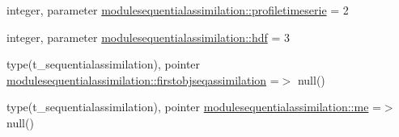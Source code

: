 \begin{DoxyCompactItemize}
\item 
integer, parameter \mbox{\hyperlink{namespacemodulesequentialassimilation_a9f871dcd1917128408934c12201b788f}{modulesequentialassimilation\+::profiletimeserie}} = 2
\item 
integer, parameter \mbox{\hyperlink{namespacemodulesequentialassimilation_af5f287d70e177aabed0e646fcd67dd61}{modulesequentialassimilation\+::hdf}} = 3
\item 
type(t\+\_\+sequentialassimilation), pointer \mbox{\hyperlink{namespacemodulesequentialassimilation_a056c2a02f7b1564811985bd04900793f}{modulesequentialassimilation\+::firstobjseqassimilation}} =$>$ null()
\item 
type(t\+\_\+sequentialassimilation), pointer \mbox{\hyperlink{namespacemodulesequentialassimilation_afebfebdaf1bfbc40b82684dd17f50357}{modulesequentialassimilation\+::me}} =$>$ null()
\end{DoxyCompactItemize}
